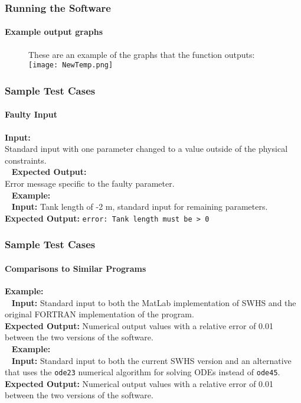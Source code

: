 \documentclass{beamer}
\begin{document}
\begin{frame}
	\frametitle{Running the Software}
	\framesubtitle{Example output graphs}
	\begin{figure}[center]
	These are an example of the graphs that the function outputs:
	\texttt{[image: NewTemp.png]}
	\end{figure}
\end{frame}
	
\begin{frame}[fragile]
	\frametitle{Sample Test Cases}
	\framesubtitle{Faulty Input}
	\textbf{Input:}\\
	Standard input with one parameter changed to a value outside of the physical constraints.\\
	~\newline
	\textbf{Expected Output:}\\
	Error message specific to the faulty parameter.\\
	~\newline
	\textbf{Example:}\\
	~\newline
	\textbf{Input:} Tank length of -2 m, standard input for remaining parameters.\\
	\textbf{Expected Output:} \verb|error: Tank length must be > 0|		
\end{frame}

\begin{frame}[fragile]
	\frametitle{Sample Test Cases}
	\framesubtitle{Comparisons to Similar Programs}
	\textbf{Example:}\\
	~\newline
	\textbf{Input:} Standard input to both the MatLab implementation of SWHS and the original FORTRAN implementation of the program.\\
	\textbf{Expected Output:} Numerical output values with a relative error of 0.01 between the two versions of the software.\\
	~\newline
	\textbf{Example:}\\
	~\newline
	\textbf{Input:} Standard input to both the current SWHS version and an alternative that uses the \verb|ode23| numerical algorithm for solving ODEs instead of \verb|ode45|.\\
	\textbf{Expected Output:} Numerical output values with a relative error of 0.01 between the two versions of the software.\\
\end{frame}
\end{document}

